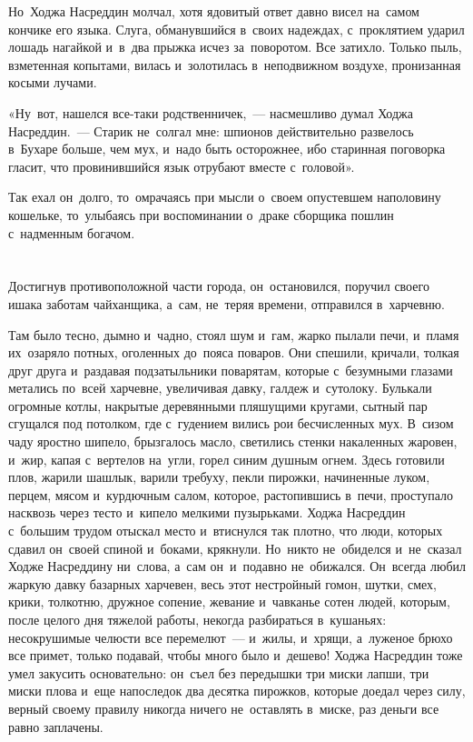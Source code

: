 \documentclass[12pt,a4paper]{book}
\begin{document}
Но~Ходжа Насреддин молчал, хотя ядовитый ответ давно висел на~самом кончике его языка. Слуга, обманувшийся в~своих надеждах, с~проклятием ударил лошадь нагайкой и~в~два прыжка исчез за~поворотом. Все затихло. Только пыль, взметенная копытами, вилась и~золотилась в~неподвижном воздухе, пронизанная косыми лучами.

«Ну~вот, нашелся все-таки родственничек,~— насмешливо думал Ходжа Насреддин.~— Старик не~солгал мне: шпионов действительно развелось в~Бухаре больше, чем мух, и~надо быть осторожнее, ибо старинная поговорка гласит, что провинившийся язык отрубают вместе с~головой».

Так ехал он~долго, то~омрачаясь при мысли о~своем опустевшем наполовину кошельке, то~улыбаясь при воспоминании о~драке сборщика пошлин с~надменным богачом.


\chapter{}

Достигнув противоположной части города, он~остановился, поручил своего ишака заботам чайханщика, а~сам, не~теряя времени, отправился в~харчевню.

Там было тесно, дымно и~чадно, стоял шум и~гам, жарко пылали печи, и~пламя их~озаряло потных, оголенных до~пояса поваров. Они спешили, кричали, толкая друг друга и~раздавая подзатыльники поварятам, которые с~безумными глазами метались по~всей харчевне, увеличивая давку, галдеж и~сутолоку. Булькали огромные котлы, накрытые деревянными пляшущими кругами, сытный пар сгущался под потолком, где с~гудением вились рои бесчисленных мух. В~сизом чаду яростно шипело, брызгалось масло, светились стенки накаленных жаровен, и~жир, капая с~вертелов на~угли, горел синим душным огнем. Здесь готовили плов, жарили шашлык, варили требуху, пекли пирожки, начиненные луком, перцем, мясом и~курдючным салом, которое, растопившись в~печи, проступало насквозь через тесто и~кипело мелкими пузырьками. Ходжа Насреддин с~большим трудом отыскал место и~втиснулся так плотно, что люди, которых сдавил он~своей спиной и~боками, крякнули. Но~никто не~обиделся и~не~сказал Ходже Насреддину ни~слова, а~сам он~и~подавно не~обижался. Он~всегда любил жаркую давку базарных харчевен, весь этот нестройный гомон, шутки, смех, крики, толкотню, дружное сопение, жевание и~чавканье сотен людей, которым, после целого дня тяжелой работы, некогда разбираться в~кушаньях: несокрушимые челюсти все перемелют~— и~жилы, и~хрящи, а~луженое брюхо все примет, только подавай, чтобы много было и~дешево! Ходжа Насреддин тоже умел закусить основательно: он~съел без передышки три миски лапши, три миски плова и~еще напоследок два десятка пирожков, которые доедал через силу, верный своему правилу никогда ничего не~оставлять в~миске, раз деньги все равно заплачены.
\end{document}

